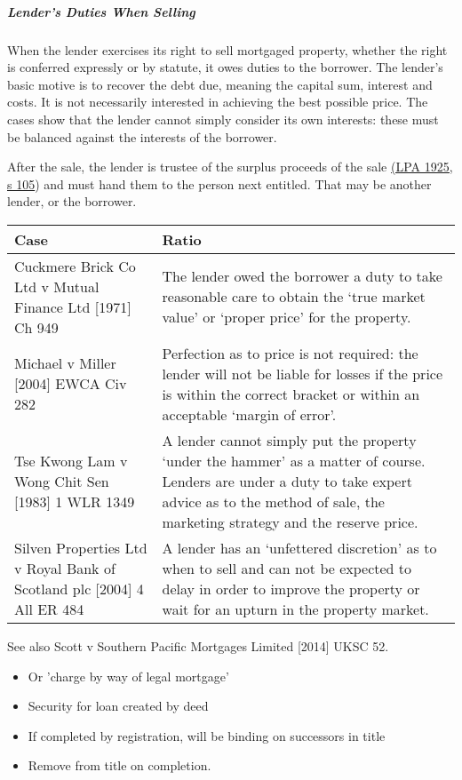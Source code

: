 \documentclass[
]{article}
\providecommand{\tightlist}{%
  \setlength{\itemsep}{0pt}\setlength{\parskip}{0pt}}
\begin{document}
\hypertarget{lenders-duties-when-selling}{%
\subparagraph{Lender's Duties When
Selling}\label{lenders-duties-when-selling}}

When the lender exercises its right to sell mortgaged property, whether
the right is conferred expressly or by statute, it owes duties to the
borrower. The lender's basic motive is to recover the debt due, meaning
the capital sum, interest and costs. It is not necessarily interested in
achieving the best possible price. The cases show that the lender cannot
simply consider its own interests: these must be balanced against the
interests of the borrower.

After the sale, the lender is trustee of the surplus proceeds of the
sale
\href{https://www.legislation.gov.uk/ukpga/Geo5/15-16/20/section/105}{(LPA
1925, s 105}) and must hand them to the person next entitled. That may
be another lender, or the borrower.

\begin{longtable}[]{@{}ll@{}}
\toprule()
Case & Ratio \\
\midrule()
\endhead
Cuckmere Brick Co Ltd v Mutual Finance Ltd {[}1971{]} Ch 949 & The
lender owed the borrower a duty to take reasonable care to obtain the
`true market value' or `proper price' for the property. \\
Michael v Miller {[}2004{]} EWCA Civ 282 & Perfection as to price is not
required: the lender will not be liable for losses if the price is
within the correct bracket or within an acceptable `margin of error'. \\
Tse Kwong Lam v Wong Chit Sen {[}1983{]} 1 WLR 1349 & A lender cannot
simply put the property `under the hammer' as a matter of course.
Lenders are under a duty to take expert advice as to the method of sale,
the marketing strategy and the reserve price. \\
Silven Properties Ltd v Royal Bank of Scotland plc {[}2004{]} 4 All ER
484 & A lender has an `unfettered discretion' as to when to sell and can
not be expected to delay in order to improve the property or wait for an
upturn in the property market. \\
\bottomrule()
\end{longtable}

See also Scott v Southern Pacific Mortgages Limited {[}2014{]} UKSC 52.

\begin{itemize}
\tightlist
\item
  Or 'charge by way of legal mortgage'
\item
  Security for loan created by deed
\item
  If completed by registration, will be binding on successors in title
\item
  Remove from title on completion.
\end{itemize}
\end{document}
